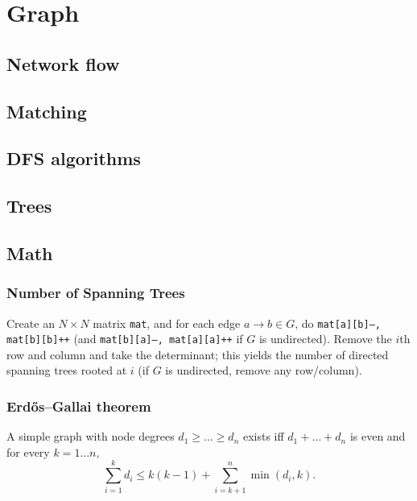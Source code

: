 \chapter{Graph}

\section{Network flow}
	
\section{Matching}

\section{DFS algorithms}

\section{Trees}

\section{Math}
	\subsection{Number of Spanning Trees}
		Create an $N\times N$ matrix \texttt{mat}, and for each edge $a \rightarrow b \in G$, do
		\texttt{mat[a][b]--, mat[b][b]++} (and \texttt{mat[b][a]--, mat[a][a]++} if $G$ is undirected).
		Remove the $i$th row and column and take the determinant; this yields the number of directed spanning trees rooted at $i$
		(if $G$ is undirected, remove any row/column).

	\subsection{Erdős–Gallai theorem}
		A simple graph with node degrees $d_1 \ge \dots \ge d_n$ exists iff $d_1 + \dots + d_n$ is even and for every $k = 1\dots n$,
		\[ \sum _{i=1}^{k}d_{i}\leq k(k-1)+\sum _{i=k+1}^{n}\min(d_{i},k). \]
